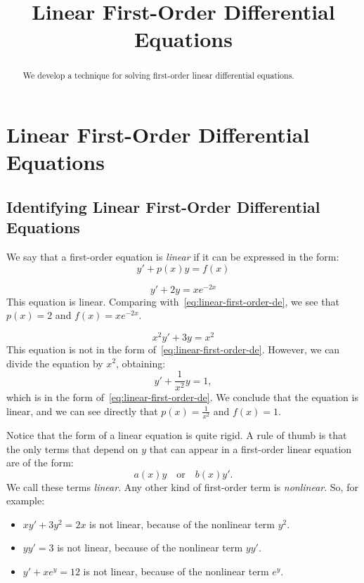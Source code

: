 \documentclass{ximera}
\title{Linear First-Order Differential Equations}
\begin{document}
 
\begin{abstract}
We develop a technique for solving first-order linear differential equations.
\end{abstract}
 
\maketitle
 
\section*{Linear First-Order Differential Equations}
\subsection*{Identifying Linear First-Order Differential Equations}
 
We say that a first-order equation is \textit{linear} if it can be expressed in the form:
\begin{equation}
\label{eq:linear-first-order-de}
y'+p(x)y=f(x)
\end{equation}
\begin{example}\label{ex:linearex1}
$$y'+2y=xe^{-2x}$$
This equation is linear. Comparing with~\eqref{eq:linear-first-order-de}, we see that $p(x)=2$ and $f(x)=xe^{-2x}$.
\end{example}
 
\begin{example}\label{ex:linearex2}
$$x^2y'+3y=x^2$$
This equation is not in the form of~\eqref{eq:linear-first-order-de}. However, we can divide the equation by $x^2$, obtaining:
$$
y'+\frac{1}{x^2}y=1,
$$
which is in the form of~\eqref{eq:linear-first-order-de}. We conclude that the equation is linear, and we can see directly that $p(x)=\frac{1}{x^2}$ and $f(x)=1$.
\end{example}
Notice that the form of a linear equation is quite rigid. A rule of thumb is that the only terms that depend on $y$ that can appear in a first-order linear equation are of the form:
\[
a(x)y\quad\text{or}\quad b(x)y'.
\]
We call these terms \textit{linear}. Any other kind of first-order term is \textit{nonlinear}. So, for example:
\begin{itemize}
\item $\displaystyle xy'+3y^2=2x$ is not linear, because of the nonlinear term $y^2$.
\item $\displaystyle yy' = 3$ is not linear, because of the nonlinear term $yy'$.
\item $\displaystyle y'+xe^y=12$ is not linear, because of the nonlinear term $e^y$.
\end{itemize}
 
\end{document}
